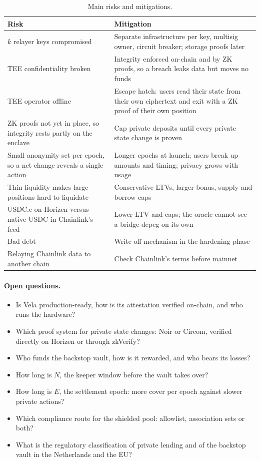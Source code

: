 \documentclass[11pt,a4paper]{article}
\begin{document}
\begin{table}[h]
\centering
\caption{Main risks and mitigations.}
\begin{tabularx}{\textwidth}{@{}LL@{}}
\toprule
Risk & Mitigation \\
\midrule
$k$ relayer keys compromised & Separate infrastructure per key, multisig owner, circuit breaker; storage proofs
  later \\
TEE confidentiality broken & Integrity enforced on-chain and by ZK proofs, so a breach leaks data but moves no
  funds \\
TEE operator offline & Escape hatch: users read their state from their own ciphertext and exit with a ZK proof
  of their own position \\
ZK proofs not yet in place, so integrity rests partly on the enclave & Cap private deposits until every private
  state change is proven \\
Small anonymity set per epoch, so a net change reveals a single action & Longer epochs at launch; users break up
  amounts and timing; privacy grows with usage \\
Thin liquidity makes large positions hard to liquidate & Conservative LTVs, larger bonus, supply and borrow
  caps \\
USDC.e on Horizen versus native USDC in Chainlink's feed & Lower LTV and caps; the oracle cannot see a bridge
  depeg on its own \\
Bad debt & Write-off mechanism in the hardening phase \\
Relaying Chainlink data to another chain & Check Chainlink's terms before mainnet \\
\bottomrule
\end{tabularx}
\end{table}

\paragraph{Open questions.}
\begin{itemize}
  \item Is Vela production-ready, how is its attestation verified on-chain, and who runs the hardware?
  \item Which proof system for private state changes: Noir or Circom, verified directly on Horizen or through
        zkVerify?
  \item Who funds the backstop vault, how is it rewarded, and who bears its losses?
  \item How long is $N$, the keeper window before the vault takes over?
  \item How long is $E$, the settlement epoch: more cover per epoch against slower private actions?
  \item Which compliance route for the shielded pool: allowlist, association sets or both?
  \item What is the regulatory classification of private lending and of the backstop vault in the Netherlands
        and the EU?
\end{itemize}



\end{document}
